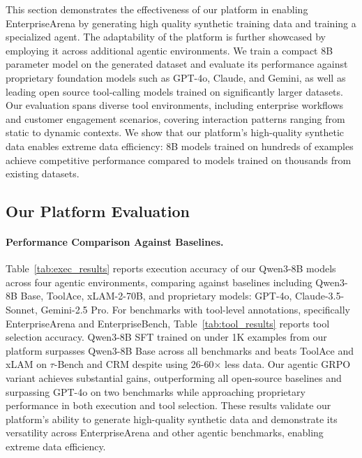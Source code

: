 \documentclass{article}
\theoremstyle{plain}
\theoremstyle{definition}
\theoremstyle{remark}
\begin{document}


This section demonstrates the effectiveness of our platform in enabling EnterpriseArena by generating high quality synthetic training data and training a specialized agent. The adaptability of the platform is further showcased by employing it across additional agentic environments.
We train a compact 8B parameter model on the generated dataset and evaluate its performance against proprietary foundation models such as GPT-4o, Claude, and Gemini, as well as leading open source tool-calling models trained on significantly larger datasets. Our evaluation spans diverse tool environments, including enterprise workflows and customer engagement scenarios, covering interaction patterns ranging from static to dynamic contexts.
We show that our platform's high-quality synthetic data enables extreme data efficiency: 8B models trained on hundreds of examples achieve competitive performance compared to models trained on thousands from existing datasets.

\vspace{-0.2cm}
\subsection{Our Platform Evaluation}
\vspace{-0.2cm}
\paragraph{Performance Comparison Against Baselines.} 
Table~\ref{tab:exec_results} reports execution accuracy of our Qwen3-8B models across four agentic environments, comparing against baselines including Qwen3-8B Base, ToolAce, xLAM-2-70B, and proprietary models: GPT-4o, Claude-3.5-Sonnet, Gemini-2.5 Pro. For benchmarks with tool-level annotations, specifically EnterpriseArena and EnterpriseBench, Table~\ref{tab:tool_results} reports tool selection accuracy. 
Qwen3-8B SFT trained on under 1K examples from our platform surpasses Qwen3-8B Base across all benchmarks and beats ToolAce and xLAM on $\tau$-Bench and CRM despite using 26-60$\times$ less data. Our agentic GRPO variant achieves substantial gains, outperforming all open-source baselines and surpassing GPT-4o on two benchmarks while approaching proprietary performance in both execution and tool selection.
These results validate our platform's ability to generate high-quality synthetic data and demonstrate its versatility across EnterpriseArena and other agentic benchmarks, enabling extreme data efficiency.
\end{document}
